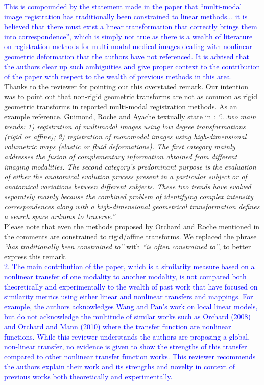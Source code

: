 \documentclass[onecolumn]{IEEEtran}
\begin{document}
\textcolor{blue}{This is compounded by the statement made in the paper that ``multi-modal image registration has traditionally been constrained to linear methods... it is believed that there must exist a linear transformation that correctly brings them into correspondence'', which is simply not true as there is a wealth of literature on registration methods for multi-modal medical images dealing with nonlinear geometric deformation that the authors have not referenced. It is advised that the authors clear up such ambiguities and give proper context to the contribution of the paper with respect to the wealth of previous methods in this area.}\\

Thanks to the reviewer for pointing out this overstated remark. Our intention was to point out that non-rigid geometric transforms are not as common as rigid geometric transforms in reported multi-modal registration methods. As an example reference, Guimond, Roche and Ayache textually state in \cite{Guimond2001}: {\it ``...two main trends: 1) registration of multimodal images using low degree transformations (rigid or affine); 2) registration of monomodal images using high-dimensional volumetric maps (elastic or fluid deformations). The first category mainly addresses the fusion of complementary information obtained from different imaging modalities. The second category’s predominant purpose is the evaluation of either the anatomical evolution process present in a particular subject or of anatomical variations between different subjects. These two trends have evolved separately mainly because the combined problem of identifying complex intensity correspondences along with a high-dimensional geometrical transformation defines a search space arduous to traverse.''}\\

Please note that even the methods proposed by Orchard \cite{Orchard2008,Orchard2010} and Roche \cite{Roche1998} mentioned in the comments are constrained to rigid/affine transforms. We replaced the phrase {\it ``has traditionally been constrained to''} with {\it ``is often constrained to''}, to better express this remark.\\

\textcolor{blue}{2. The main contribution of the paper, which is a similarity measure based on a nonlinear transfer of one modality to another modality, is not compared both theoretically and experimentally to the wealth of past work that have focused on similarity metrics using either linear and nonlinear transfers and mappings.  For example, the authors acknowledges Wang and Pan's work on local linear models, but do not acknowledge the multitude of similar works such as Orchard (2008) and Orchard and Mann (2010) where the transfer function are nonlinear functions. While this reviewer understands the authors are proposing a global, non-linear transfer, no evidence is given to show the strengths of this transfer compared to other nonlinear transfer function works.  This reviewer recommends the authors explain their work and its strengths and novelty in context of previous works both theoretically and experimentally.}\\
\end{document}
